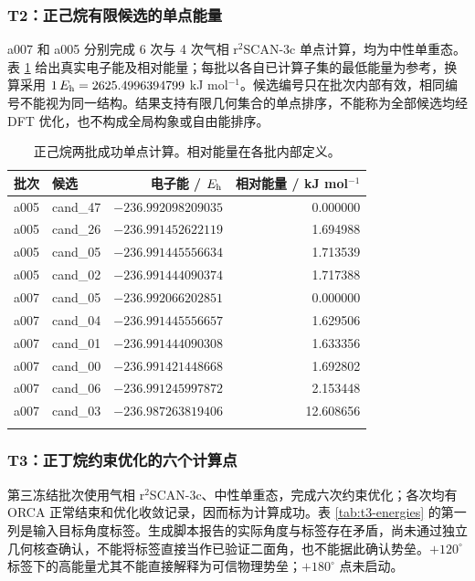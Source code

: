 \subsubsection{T2：正己烷有限候选的单点能量}
a007 和 a005 分别完成 6 次与 4 次气相 r$^{2}$SCAN-3c 单点计算，均为中性单重态。表 \ref{tab:t2-energies} 给出真实电子能及相对能量；每批以各自已计算子集的最低能量为参考，换算采用 $1\,E_{\mathrm h}=2625.4996394799$ kJ mol$^{-1}$。候选编号只在批次内部有效，相同编号不能视为同一结构。结果支持有限几何集合的单点排序，不能称为全部候选均经 DFT 优化，也不构成全局构象或自由能排序。

\begin{table}[htbp]
\centering\small
\caption{正己烷两批成功单点计算。相对能量在各批内部定义。}
\label{tab:t2-energies}
\begin{tabular}{llrr}
\toprule
批次 & 候选 & 电子能 / $E_{\mathrm h}$ & 相对能量 / kJ mol$^{-1}$\\
\midrule
a005 & cand\_47 & $-236.992098209035$ & 0.000000\\
a005 & cand\_26 & $-236.991452622119$ & 1.694988\\
a005 & cand\_05 & $-236.991445556634$ & 1.713539\\
a005 & cand\_02 & $-236.991444090374$ & 1.717388\\
\addlinespace
a007 & cand\_05 & $-236.992066202851$ & 0.000000\\
a007 & cand\_04 & $-236.991445556657$ & 1.629506\\
a007 & cand\_01 & $-236.991444090308$ & 1.633356\\
a007 & cand\_00 & $-236.991421448668$ & 1.692802\\
a007 & cand\_06 & $-236.991245997872$ & 2.153448\\
a007 & cand\_03 & $-236.987263819406$ & 12.608656\\
\addlinespace
\bottomrule
\end{tabular}
\end{table}

\subsubsection{T3：正丁烷约束优化的六个计算点}
第三冻结批次使用气相 r$^{2}$SCAN-3c、中性单重态，完成六次约束优化；各次均有 ORCA 正常结束和优化收敛记录，因而标为计算成功。表 \ref{tab:t3-energies} 的第一列是输入目标角度标签。生成脚本报告的实际角度与标签存在矛盾，尚未通过独立几何核查确认，不能将标签直接当作已验证二面角，也不能据此确认势垒。$+120^\circ$ 标签下的高能量尤其不能直接解释为可信物理势垒；$+180^\circ$ 点未启动。


